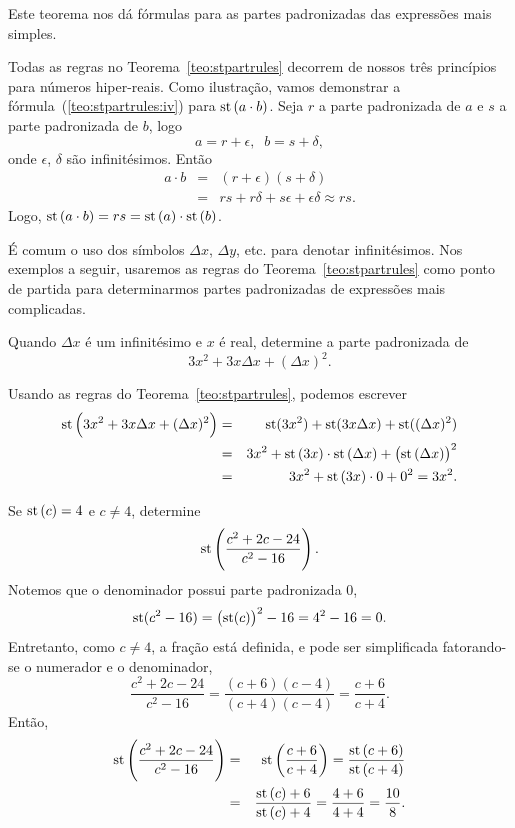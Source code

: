 Este teorema nos dá fórmulas para as partes padronizadas das expressões
mais simples.

Todas as regras no Teorema~\ref{teo:stpartrules} decorrem de nossos três
princípios para números hiper-reais. Como ilustração, vamos demonstrar a
fórmula~(\ref{teo:stpartrules:iv}) para $\operatorname{st}\left(a \cdot b\right)$. Seja $r$ a parte
padronizada de $a$ e $s$ a parte padronizada de $b$, logo
$$
  a = r + \epsilon, \; \; b = s + \delta,
$$
onde $\epsilon$, $\delta$ são infinitésimos. Então
\begin{eqnarray*}
a \cdot b & = & (r + \epsilon)(s + \delta) \\
          & = & rs + r\delta + s\epsilon + \epsilon\delta \approx rs.
\end{eqnarray*}
Logo, $\operatorname{st}\left(a\cdot b\right) = rs = \operatorname{st}\left(a\right) \cdot \operatorname{st}\left(b\right)$.

É comum o uso dos símbolos $\Delta{x}$, $\Delta{y}$, etc. para denotar
infinitésimos. Nos exemplos a seguir, usaremos as regras do
Teorema~\ref{teo:stpartrules} como ponto de partida para determinarmos
partes padronizadas de expressões mais complicadas.

\begin{example}
Quando $\Delta{x}$ é um infinitésimo e $x$ é real, determine a parte
padronizada de
$$
  3x^2 + 3x\Delta{x} + (\Delta{x})^2.
$$

Usando as regras do Teorema~\ref{teo:stpartrules}, podemos escrever
\begin{eqnarray*}
  \operatorname{st}\left(3x^2 + 3x\Delta{x} + (\Delta{x})^2\right) & = &
     \operatorname{st}(3x^2) + \operatorname{st}(3x\Delta{x}) + \operatorname{st}((\Delta{x})^2) \\
  & = &
    3x^2 + \operatorname{st}\left(3x\right)\cdot\operatorname{st}\left(\Delta{x}\right) + \left(\operatorname{st}\left(\Delta{x}\right)\right)^2 \\
  & = &
    3x^2 + \operatorname{st}\left(3x\right)\cdot 0 + 0^2 = 3x^2.
\end{eqnarray*}
\end{example}

\begin{example}
\label{ex:stpartfrac}
Se $\operatorname{st}\left(c\right) = 4$ e $c \ne 4$, determine
$$
  \operatorname{st}\left(\frac{c^2 + 2c - 24}{c^2 - 16}\right).
$$
Notemos que o denominador possui parte padronizada $0$,
$$
  \operatorname{st}(c^2 - 16) = \left(\operatorname{st}(c)\right)^2 - 16 = 4^2 - 16 = 0.
$$
Entretanto, como $c \ne 4$, a fração está definida, e pode ser simplificada
fatorando-se o numerador e o denominador,
$$
  \frac{c^2 + 2c - 24}{c^2 - 16} =
  \frac{(c+6)(c-4)}{(c+4)(c-4)} =
  \frac{c+6}{c+4}.
$$
Então,
\begin{eqnarray*}
  \operatorname{st}\left(\frac{c^2 + 2c - 24}{c^2 - 16}\right) & = & \operatorname{st}\left(\frac{c+6}{c+4}\right) =
    \frac{\operatorname{st}\left(c+6\right)}{\operatorname{st}\left(c+4\right)} \\
  & = & \frac{\operatorname{st}\left(c\right) + 6}{\operatorname{st}\left(c\right) + 4} = \frac{4 + 6}{4 + 4} = \frac{10}{8}.
\end{eqnarray*}
\end{example}

